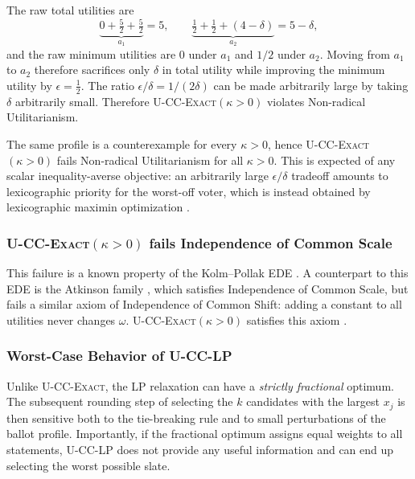 \documentclass[letterpaper]{article} %
\newcommand{\Exact}{\textsc{U-CC-Exact}}
\newcommand{\ExactP}{\textsc{U-CC-Exact}$(\kappa>0)$}
\newcommand{\LP}{\textsc{U-CC-LP}}
\begin{document}
The raw total utilities are
\[
\underbrace{0+\tfrac52+\tfrac52}_{a_1}=5,\qquad
\underbrace{\tfrac12+\tfrac12+(4-\delta)}_{a_2}=5-\delta,
\]
and the raw minimum utilities are \(0\) under \(a_1\) and \(1/2\) under \(a_2\).
Moving from \(a_1\) to \(a_2\) therefore sacrifices only \(\delta\) in total utility while improving the minimum utility by \( \epsilon=\tfrac12 .\)
The ratio \(\epsilon/\delta = 1/(2\delta)\) can be made arbitrarily large by taking \(\delta\) arbitrarily small.
Therefore \ExactP{} violates Non-radical Utilitarianism.

The same profile is a counterexample for every \(\kappa>0\), hence \ExactP{} fails Non-radical Utilitarianism for all \(\kappa>0\).
This is expected of any scalar inequality-averse objective: an arbitrarily large \(\epsilon/\delta\) tradeoff amounts to lexicographic priority for the worst-off voter, which is instead obtained by lexicographic maximin optimization \citep{luss-1999, kostreva-ogryczak-wierzbicki-2004}.

\subsubsection{\ExactP{} fails Independence of Common Scale}
\label{app:exactp-ics}

This failure is a known property of the Kolm--Pollak EDE \citep{kolm-1976, blackorby-donaldson-1980}.
A counterpart to this EDE is the Atkinson family \citep{atkinson-1970}, which satisfies Independence of Common Scale, but fails a similar axiom of Independence of Common Shift: adding a constant to all utilities never changes $\omega$.
\ExactP{} satisfies this axiom \citep{blackorby-donaldson-1980}.

\subsubsection{Worst-Case Behavior of \LP{}}
\label{app:lp-worst}

Unlike \Exact{}, the LP relaxation can have a \emph{strictly fractional} optimum.
The subsequent rounding step of selecting the $k$ candidates with the largest $x_j$ is then sensitive both to the tie-breaking rule and to small perturbations of the ballot profile.
Importantly, if the fractional optimum assigns equal weights to all statements, \LP{} does not provide any useful information and can end up selecting the worst possible slate.
\end{document}
